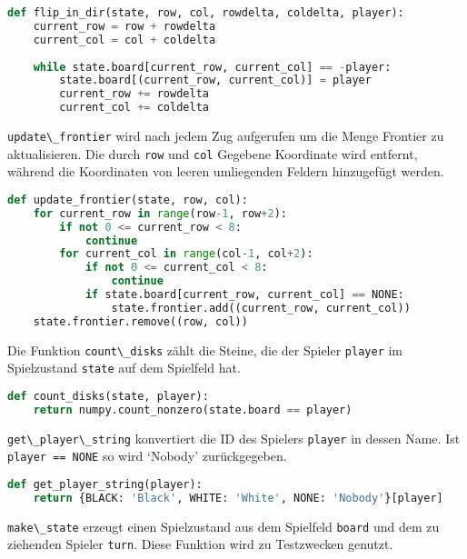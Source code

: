 \begin{lstlisting}[language=Python]
def flip_in_dir(state, row, col, rowdelta, coldelta, player):
    current_row = row + rowdelta
    current_col = col + coldelta
    
    while state.board[current_row, current_col] == -player:
        state.board[(current_row, current_col)] = player
        current_row += rowdelta
        current_col += coldelta
\end{lstlisting}

\passthrough{\lstinline!update\_frontier!} wird nach jedem Zug
aufgerufen um die Menge Frontier zu aktualisieren. Die durch
\passthrough{\lstinline!row!} und \passthrough{\lstinline!col!} Gegebene
Koordinate wird entfernt, während die Koordinaten von leeren umliegenden
Feldern hinzugefügt werden.

\begin{lstlisting}[language=Python]
def update_frontier(state, row, col):
    for current_row in range(row-1, row+2):
        if not 0 <= current_row < 8:
            continue
        for current_col in range(col-1, col+2):
            if not 0 <= current_col < 8:
                continue
            if state.board[current_row, current_col] == NONE:
                state.frontier.add((current_row, current_col))
    state.frontier.remove((row, col))
\end{lstlisting}

Die Funktion \passthrough{\lstinline!count\_disks!} zählt die Steine,
die der Spieler \passthrough{\lstinline!player!} im Spielzustand
\passthrough{\lstinline!state!} auf dem Spielfeld hat.

\begin{lstlisting}[language=Python]
def count_disks(state, player):
    return numpy.count_nonzero(state.board == player)
\end{lstlisting}

\passthrough{\lstinline!get\_player\_string!} konvertiert die ID des
Spielers \passthrough{\lstinline!player!} in dessen Name. Ist
\passthrough{\lstinline!player == NONE!} so wird `Nobody' zurückgegeben.

\begin{lstlisting}[language=Python]
def get_player_string(player):
    return {BLACK: 'Black', WHITE: 'White', NONE: 'Nobody'}[player]
\end{lstlisting}

\passthrough{\lstinline!make\_state!} erzeugt einen Spielzustand aus dem
Spielfeld \passthrough{\lstinline!board!} und dem zu ziehenden Spieler
\passthrough{\lstinline!turn!}. Diese Funktion wird zu Testzwecken
genutzt.

